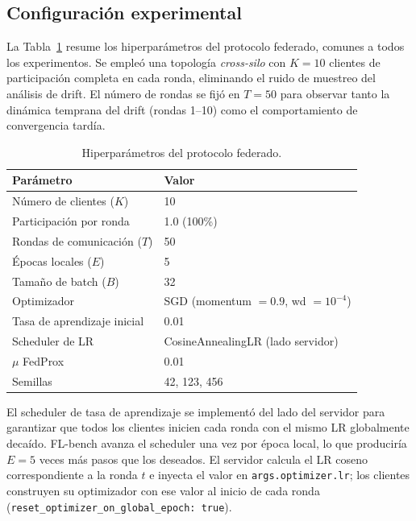 \subsection{Configuración experimental}

La Tabla~\ref{tab:fl_config} resume los hiperparámetros del protocolo federado, comunes a
todos los experimentos. Se empleó una topología \textit{cross-silo} con $K = 10$ clientes
de participación completa en cada ronda, eliminando el ruido de muestreo del análisis de
drift. El número de rondas se fijó en $T = 50$ para observar tanto la dinámica temprana del
drift (rondas 1--10) como el comportamiento de convergencia tardía.

\begin{table}[H]
\centering
\caption{Hiperparámetros del protocolo federado.}
\label{tab:fl_config}
\begin{tabular}{ll}
\hline
Parámetro                        & Valor \\
\hline
Número de clientes ($K$)         & 10 \\
Participación por ronda          & 1.0 (100\%) \\
Rondas de comunicación ($T$)     & 50 \\
Épocas locales ($E$)             & 5 \\
Tamaño de batch ($B$)            & 32 \\
Optimizador                      & SGD (momentum $= 0.9$, wd $= 10^{-4}$) \\
Tasa de aprendizaje inicial      & 0.01 \\
Scheduler de LR                  & CosineAnnealingLR (lado servidor) \\
$\mu$ FedProx                    & 0.01 \\
Semillas                         & 42, 123, 456 \\
\hline
\end{tabular}
\end{table}

El scheduler de tasa de aprendizaje se implementó del lado del servidor para garantizar
que todos los clientes inicien cada ronda con el mismo LR globalmente decaído. FL-bench
avanza el scheduler una vez por época local, lo que produciría $E = 5$ veces más pasos que
los deseados. El servidor calcula el LR coseno correspondiente a la ronda $t$ e inyecta el
valor en \texttt{args.optimizer.lr}; los clientes construyen su optimizador con ese valor
al inicio de cada ronda (\texttt{reset\_optimizer\_on\_global\_epoch: true}).

